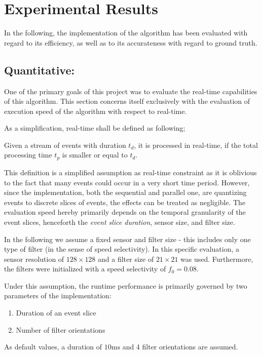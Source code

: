 \newpage
\section{Experimental Results}
In the following, the implementation of the algorithm has been evaluated with regard to its efficiency, as well as to its accurateness with regard to ground truth.

\subsection{Quantitative:}
One of the primary goals of this project was to evaluate the real-time capabilities of this algorithm.
This section concerns itself exclusively with the evaluation of execution speed of the algorithm with respect to real-time.

As a simplification, real-time shall be defined as following;
\begin{defwrp}
	Given a stream of events with duration $t_d$, it is processed in real-time, if the total processing time $t_p$ is smaller or equal to $t_d$.
\end{defwrp}

This definition is a simplified assumption as real-time constraint as it is oblivious to the fact that many events could occur in a very short time period.
However, since the implementation, both the sequential and parallel one, are quantizing events to discrete slices of events, the effects can be treated as negligible.
The evaluation speed hereby primarily depends on the temporal granularity of the event slices, henceforth the \textit{event slice duration}, sensor size, and filter size.

In the following we assume a fixed sensor and filter size - this includes only one type of filter (in the sense of speed selectivity).
In this specific evaluation, a sensor resolution of $128\times128$ and a filter size of $21\times21$ was used.
Furthermore, the filters were initialized with a speed selectivity of $f_0=0.08$.

Under this assumption, the runtime performance is primarily governed by two parameters of the implementation:
\begin{enumerate}
	\item Duration of an event slice
	\item Number of filter orientations
\end{enumerate}

As default values, a duration of $10\mathrm{ms}$ and 4 filter orientations are assumed.

